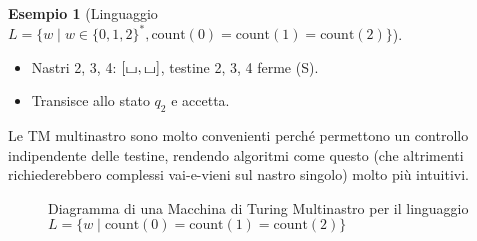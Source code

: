 \documentclass[a4paper]{article}
\theoremstyle{definition} %
\newtheorem{example}{Esempio}
\newcommand{\blankS}{\ensuremath{\raisebox{-0.15ex}{\scalebox{1.3}[0.7]{$\sqcup$}}}}
\begin{document}
\begin{example}[Linguaggio $L = \{w \mid w \in \{0,1,2\}^*, \text{count}(0)=\text{count}(1)=\text{count}(2)\}$]
\begin{itemize}
\begin{itemize}
\begin{itemize}
                    \item Nastri 2, 3, 4: $[\blankS, \blankS]$, testine 2, 3, 4 ferme (S).
                    \item Transisce allo stato $q_2$ e accetta.
                \end{itemize}
        \end{itemize}
\end{itemize}
Le TM multinastro sono molto convenienti perché permettono un controllo indipendente delle testine, rendendo algoritmi come questo (che altrimenti richiederebbero complessi vai-e-vieni sul nastro singolo) molto più intuitivi.
\end{example}

\begin{figure}[h!]
    \centering
    \caption{Diagramma di una Macchina di Turing Multinastro per il linguaggio $L=\{w \mid \text{count}(0)=\text{count}(1)=\text{count}(2)\}$}
\end{figure}
\end{document}
